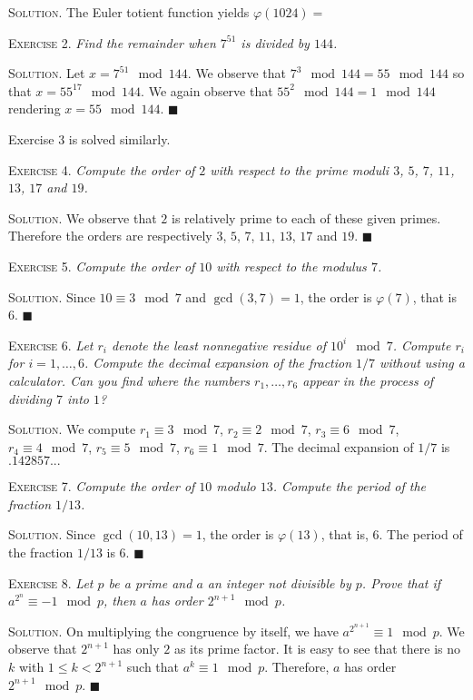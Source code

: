 \documentclass[11pt, leqno]{article}
\newcommand{\done}{\ensuremath{\blacksquare}}
\begin{document}
\textsc{Solution}. The Euler totient function yields $\varphi(1024) = $

\textsc{Exercise 2}. \emph{Find the remainder when $7^{51}$ is divided by $144$.}

\textsc{Solution}. Let $x=7^{51} \mod 144$. We observe that $7^3\mod 144 = 55 \mod 144$ so that $x = 55^{17} \mod 144$. We again observe that $55^2 \mod 144 = 1\mod 144$ rendering $x = 55 \mod 144$. \done

Exercise 3 is solved similarly.

\textsc{Exercise 4}. \emph{Compute the order of $2$ with respect to the prime moduli $3$, $5$, $7$, $11$, $13$, $17$ and $19$.}

\textsc{Solution}. We observe that $2$ is relatively prime to each of these given primes. Therefore the orders are respectively $3$, $5$, $7$, $11$, $13$, $17$ and $19$. \done

\textsc{Exercise 5}. \emph{Compute the order of $10$ with respect to the modulus $7$.}

\textsc{Solution}. Since $10 \equiv 3 \mod 7$ and $\gcd(3,7) = 1$, the order is $\varphi(7)$, that is $6$. \done

\textsc{Exercise 6}. \emph{Let $r_i$ denote the least nonnegative residue of $10^i \mod 7$. Compute $r_i$ for $i=1,\ldots,6$. Compute the decimal expansion of the fraction $1/7$ without using a calculator. Can you find where the numbers $r_1, \ldots, r_6$ appear in the process of dividing $7$ into $1$?}

\textsc{Solution}. We compute $r_1 \equiv 3 \mod 7$, $r_2 \equiv 2 \mod 7$, $r_3 \equiv 6 \mod 7$, $r_4 \equiv 4 \mod 7$, $r_5 \equiv 5 \mod 7$, $r_6 \equiv 1 \mod 7$. The decimal expansion of $1/7$ is $.142857...$

\textsc{Exercise 7}. \emph{Compute the order of $10$ modulo $13$. Compute the period of the fraction $1/13$.}

\textsc{Solution}. Since $\gcd(10,13)=1$, the order is $\varphi(13)$, that is, 6. The period of the fraction $1/13$ is 6. \done

\textsc{Exercise 8}. \emph{Let $p$ be a prime and $a$ an integer not divisible by $p$. Prove that if $a^{2^n}\equiv -1 \mod p$, then $a$ has order $2^{n+1} \mod p$.}

\textsc{Solution}. On multiplying the congruence by itself, we have $a^{2^{n+1}} \equiv 1 \mod p$. We observe that $2^{n+1}$ has only $2$ as its prime factor. It is easy to see that there is no $k$ with $1\leq k < 2^{n+1}$ such that $a^k \equiv 1 \mod p$. Therefore, $a$ has order $2^{n+1}\mod p$. \done
\end{document}

